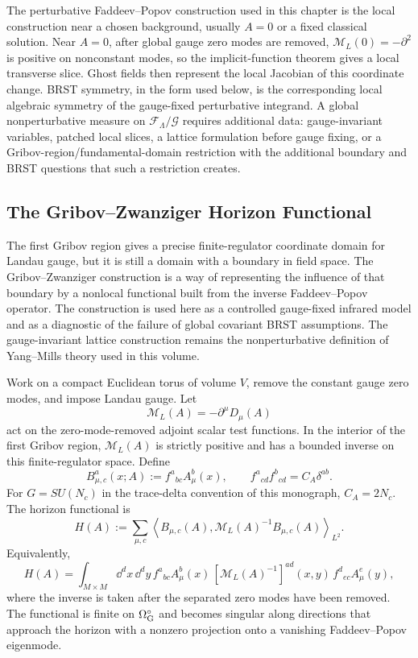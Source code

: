 The perturbative Faddeev--Popov construction used in this chapter is the local
construction near a chosen background, usually \(A=0\) or a fixed classical
solution.  Near \(A=0\), after global gauge zero modes are removed,
\(\mathcal M_L(0)=-\partial^2\) is positive on nonconstant modes, so the
implicit-function theorem gives a local transverse slice.  Ghost fields then
represent the local Jacobian of this coordinate change.  BRST symmetry, in the
form used below, is the corresponding local algebraic symmetry of the
gauge-fixed perturbative integrand.  A global nonperturbative measure on
\(\mathcal F_\Lambda/\mathcal G\) requires additional data:
gauge-invariant variables, patched local slices, a lattice formulation before
gauge fixing, or a Gribov-region/fundamental-domain restriction with the
additional boundary and BRST questions that such a restriction creates.

\subsection{The Gribov--Zwanziger Horizon Functional}

The first Gribov region gives a precise finite-regulator coordinate domain for
Landau gauge, but it is still a domain with a boundary in field space.  The
Gribov--Zwanziger construction is a way of representing the influence of that
boundary by a nonlocal functional built from the inverse Faddeev--Popov
operator.  The construction is used here as a controlled gauge-fixed infrared
model and as a diagnostic of the failure of global covariant BRST assumptions.
The gauge-invariant lattice construction remains the nonperturbative
definition of Yang--Mills theory used in this volume.

Work on a compact Euclidean torus of volume \(V\), remove the constant gauge
zero modes, and impose Landau gauge.  Let
\[
  \mathcal M_L(A)=-\partial^\mu D_\mu(A)
\]
act on the zero-mode-removed adjoint scalar test functions.  In the interior
of the first Gribov region, \(\mathcal M_L(A)\) is strictly positive and has a
bounded inverse on this finite-regulator space.  Define
\[
  B_{\mu,c}^a(x;A):=f^a{}_{bc}A_\mu^b(x),
  \qquad
  f^a{}_{cd}f^b{}_{cd}=C_A\delta^{ab}.
\]
For \(G=SU(N_c)\) in the trace-delta convention of this monograph,
\(C_A=2N_c\).  The horizon functional is
\begin{equation}
  H(A)
  :=
  \sum_{\mu,c}
  \left\langle
    B_{\mu,c}(A),
    \mathcal M_L(A)^{-1}B_{\mu,c}(A)
  \right\rangle_{L^2}.
  \label{eq:gribov-zwanziger-horizon-functional}
\end{equation}
Equivalently,
\[
  H(A)
  =
  \int_{M\times M}\dd^d x\,\dd^d y\,
  f^a{}_{bc}A_\mu^b(x)\,
  [\mathcal M_L(A)^{-1}]^{ad}(x,y)\,
  f^d{}_{ec}A_\mu^e(y),
\]
where the inverse is taken after the separated zero modes have been removed.
The functional is finite on \(\Omega_{\rm G}^{\circ}\) and becomes singular
along directions that approach the horizon with a nonzero projection onto a
vanishing Faddeev--Popov eigenmode.

